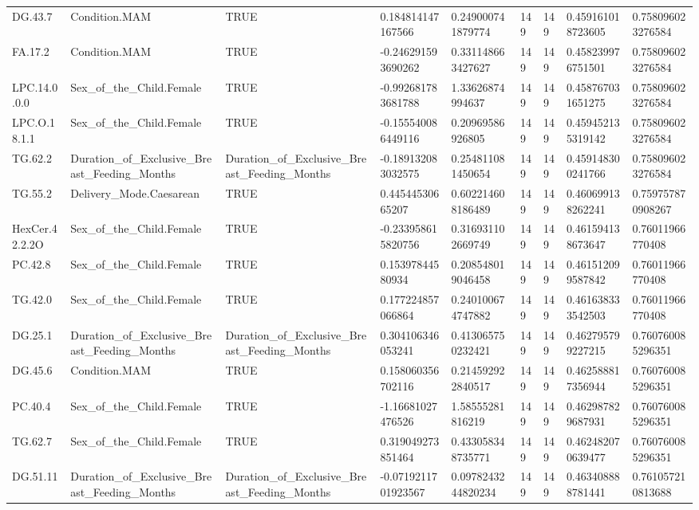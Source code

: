 \begin{longtable}{lllllllll}
DG.43.7 & Condition.MAM & TRUE & 0.184814147167566 & 0.249000741879774 & 149 & 149 & 0.459161018723605 & 0.758096023276584 \\
FA.17.2 & Condition.MAM & TRUE & -0.246291593690262 & 0.331148663427627 & 149 & 149 & 0.458239976751501 & 0.758096023276584 \\
LPC.14.0.0.0 & Sex\_of\_the\_Child.Female & TRUE & -0.992681783681788 & 1.33626874994637 & 149 & 149 & 0.458767031651275 & 0.758096023276584 \\
LPC.O.18.1.1 & Sex\_of\_the\_Child.Female & TRUE & -0.155540086449116 & 0.20969586926805 & 149 & 149 & 0.459452135319142 & 0.758096023276584 \\
TG.62.2 & Duration\_of\_Exclusive\_Breast\_Feeding\_Months & Duration\_of\_Exclusive\_Breast\_Feeding\_Months & -0.189132083032575 & 0.254811081450654 & 149 & 149 & 0.459148300241766 & 0.758096023276584 \\
TG.55.2 & Delivery\_Mode.Caesarean & TRUE & 0.44544530665207 & 0.602214608186489 & 149 & 149 & 0.460699138262241 & 0.759757870908267 \\
HexCer.42.2.2O & Sex\_of\_the\_Child.Female & TRUE & -0.233958615820756 & 0.316931102669749 & 149 & 149 & 0.461594138673647 & 0.76011966770408 \\
PC.42.8 & Sex\_of\_the\_Child.Female & TRUE & 0.15397844580934 & 0.208548019046458 & 149 & 149 & 0.461512099587842 & 0.76011966770408 \\
TG.42.0 & Sex\_of\_the\_Child.Female & TRUE & 0.177224857066864 & 0.240100674747882 & 149 & 149 & 0.461638333542503 & 0.76011966770408 \\
DG.25.1 & Duration\_of\_Exclusive\_Breast\_Feeding\_Months & Duration\_of\_Exclusive\_Breast\_Feeding\_Months & 0.304106346053241 & 0.413065750232421 & 149 & 149 & 0.462795799227215 & 0.760760085296351 \\
DG.45.6 & Condition.MAM & TRUE & 0.158060356702116 & 0.214592922840517 & 149 & 149 & 0.462588817356944 & 0.760760085296351 \\
PC.40.4 & Sex\_of\_the\_Child.Female & TRUE & -1.16681027476526 & 1.58555281816219 & 149 & 149 & 0.462987829687931 & 0.760760085296351 \\
TG.62.7 & Sex\_of\_the\_Child.Female & TRUE & 0.319049273851464 & 0.433058348735771 & 149 & 149 & 0.462482070639477 & 0.760760085296351 \\
DG.51.11 & Duration\_of\_Exclusive\_Breast\_Feeding\_Months & Duration\_of\_Exclusive\_Breast\_Feeding\_Months & -0.0719211701923567 & 0.0978243244820234 & 149 & 149 & 0.463408888781441 & 0.761057210813688 \\

\end{longtable}

